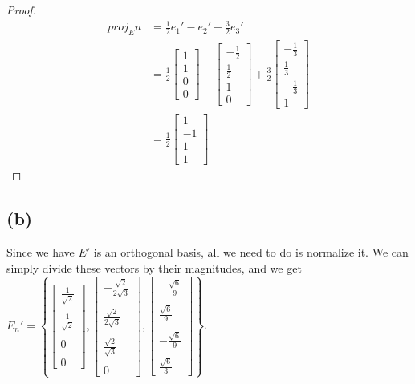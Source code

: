 \documentclass{article}
\begin{document}
\begin{proof}
\begin{align*}
proj_{E}u & = \frac{1}{2}e_1' - e_2' + \frac{3}{2}e_3' \\
& = \frac{1}{2}\begin{bmatrix}1\\1\\0\\0\end{bmatrix} - \begin{bmatrix}-\frac{1}{2}\\ \frac{1}{2} \\ 1 \\ 0\end{bmatrix} + \frac{3}{2}\begin{bmatrix}-\frac{1}{3} \\ \frac{1}{3} \\ -\frac{1}{3} \\ 1 \end{bmatrix} \\
& = \frac{1}{2}\begin{bmatrix}1\\-1\\1\\1\end{bmatrix}
\end{align*}
\end{proof}
\subsection*{(b)}
Since we have $E'$ is an orthogonal basis, all we need to do is normalize it. We can simply divide these vectors by their magnitudes, and we get $E_n' = \left\{\begin{bmatrix}\frac{1}{\sqrt{2}} \\\\ \frac{1}{\sqrt{2}} \\\\ 0 \\\\ 0 \end{bmatrix}, \begin{bmatrix}-\frac{\sqrt{2}}{2\sqrt{3}} \\\\ \frac{\sqrt{2}}{2\sqrt{3}} \\\\ \frac{\sqrt{2}}{\sqrt{3}} \\\\ 0 \end{bmatrix}, \begin{bmatrix}-\frac{\sqrt{6}}{9} \\\\ \frac{\sqrt{6}}{9} \\\\ -\frac{\sqrt{6}}{9} \\\\ \frac{\sqrt{6}}{3}\end{bmatrix}\right\}$.
\end{document}
